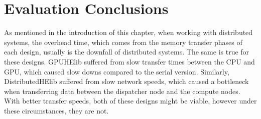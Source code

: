 \section{Evaluation Conclusions} \label{sec:EvaluationConclusions}
As mentioned in the introduction of this chapter, when working with distributed systems, the overhead time, which comes from the memory transfer phases of each design, usually is the downfall of distributed systems. The same is true for these designs. GPUHElib suffered from slow transfer times between the CPU and GPU, which caused slow downs compared to the serial version. Similarly, DistributedHElib suffered from slow network speeds, which caused a bottleneck when transferring data between the dispatcher node and the compute nodes. With better transfer speeds, both of these designs might be viable, however under these circumstances, they are not.